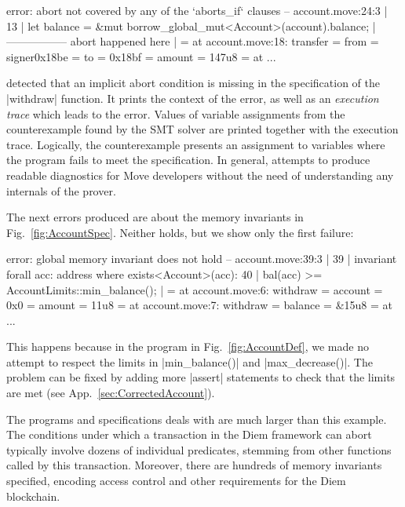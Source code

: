 \begin{MoveDiag}
error: abort not covered by any of the `aborts_if` clauses
   -- account.move:24:3
   |
13 |       let balance = &mut borrow_global_mut<Account>(account).balance;
   |                          ----------------- abort happened here
   |
   =     at account.move:18: transfer
   =         from = signer{0x18be}
   =         to = 0x18bf
   =         amount = 147u8
   =     at ...
\end{MoveDiag}

\noindent \MVP detected that an implicit abort condition is missing in the
specification of the |withdraw| function. It prints the context of the error, as
well as an \emph{execution trace} which leads to the error. Values of variable
assignments from the counterexample found by the SMT solver are printed together
with the execution trace. Logically, the counterexample presents an
assignment to variables where the program fails to meet the specification. In
general, \MVP attempts to produce readable diagnostics for Move developers
without the need of understanding any internals of the prover.

The next errors produced are about the memory invariants in
Fig.~\ref{fig:AccountSpec}. Neither holds, but
we show only the first failure:

\begin{MoveDiag}
error: global memory invariant does not hold
   -- account.move:39:3
   |
39 |    invariant forall acc: address where exists<Account>(acc):
40 |      bal(acc) >= AccountLimits::min_balance();
   |
   =     at account.move:6: withdraw
   =         account = 0x0
   =         amount = 11u8
   =     at account.move:7: withdraw
   =         balance = &15u8
   =     at ...
\end{MoveDiag}

\noindent This happens because in the program in Fig.~\ref{fig:AccountDef}, we
made no attempt to respect the limits in |min_balance()| and |max_decrease()|.
The problem can be fixed by adding more |assert| statements to check that the
limits are met (see App.~\ref{sec:CorrectedAccount}).

The programs and specifications \MVP deals with are much larger than
this example. The conditions under which a transaction
in the Diem framework can abort typically involve dozens of individual predicates,
stemming from other functions called by this transaction. Moreover, there are
hundreds of memory invariants specified, encoding access control and other
requirements for the Diem blockchain.

